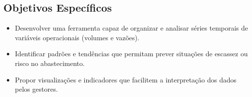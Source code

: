 \subsection{Objetivos Específicos}

\begin{itemize}
    \item Desenvolver uma ferramenta capaz de organizar e analisar séries temporais de variáveis operacionais (volumes e vazões).
    \item Identificar padrões e tendências que permitam prever situações de escassez ou risco no abastecimento.
    \item Propor visualizações e indicadores que facilitem a interpretação dos dados pelos gestores.
\end{itemize}